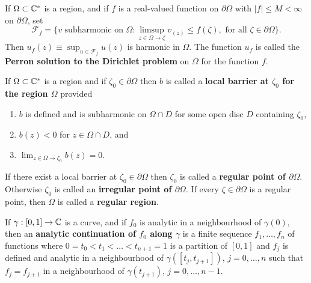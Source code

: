 \documentclass[12pt]{article}
\begin{document}
\begin{definition}
    If $\Omega\subset\mathbb{C}^*$ is a region, and if $f$ is a real-valued function on $\partial\Omega$ with $|f|\leq M<\infty$ on $\partial \Omega$, set
    \begin{equation*}
        \mathcal{F}_f=\{v \text{ subharmonic on } \Omega : \limsup_{z\in\Omega\to\zeta} v_(z)\leq f(\zeta),\text{ for all }\zeta\in\partial\Omega\}.
    \end{equation*}
    Then $u_f(z)\equiv\sup_{u\in\mathcal{F}_f} u(z)$ is harmonic in $\Omega$. The function $u_f$ is called the \textbf{Perron solution to the Dirichlet problem} on $\Omega$ for the function $f$.
\end{definition}
\newpage
\begin{definition}
    If $\Omega\subset \mathbb{C}^*$ is a region and if $\zeta_0\in\partial\Omega$ then $b$ is called a \textbf{local barrier at $\zeta_0$ for the region $\Omega$} provided
    \begin{enumerate}[label=(\roman*)]
        \item $b$ is defined and is subharmonic on $\Omega\cap D$ for some open disc $D$ containing $\zeta_0$,
        \item $b(z)<0$ for $z\in\Omega\cap D$, and
        \item $\lim_{z\in\Omega\to\zeta_0} b(z)=0$.
    \end{enumerate}
\end{definition}

\begin{definition}
    If there exist a local barrier at $\zeta_0\in\partial \Omega$ then $\zeta_0$ is called a \textbf{regular point of $\partial\Omega$}. Otherwise $\zeta_0$ is called an \textbf{irregular point of $\partial\Omega$}. If every $\zeta\in\partial\Omega$ is a regular point, then $\Omega$ is called a \textbf{regular region}.
\end{definition}

\begin{definition}
    If $\gamma:[0,1]\to\mathbb{C}$ is a curve, and if $f_0$ is analytic in a neighbourhood of $\gamma(0)$, then an \textbf{analytic continuation of $f_0$ along $\gamma$} is a finite sequence $f_1,\dots, f_n$ of functions where $0=t_0<t_1<\dots<t_{n+1}=1$ is a partition of $[0,1]$ and $f_j$ is defined and analytic in a neighbourhood of $\gamma([t_j,t_{j+1}])$, $j=0,\dots,n$ such that $f_j=f_{j+1}$ in a neighbourhood of $\gamma(t_{j+1})$, $j=0,\dots,n-1$.
\end{definition}
\end{document}
